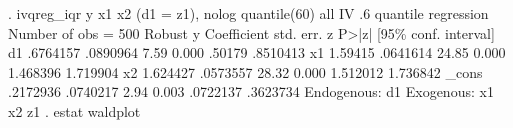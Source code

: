 . ivqreg_iqr y x1 x2 (d1 = z1), nolog quantile(60) all
{\smallskip}
IV .6 quantile regression             Number of obs               =        500
             {\VBAR}               Robust
           y {\VBAR} Coefficient  std. err.      z    P>|z|     [95\% conf. interval]
          d1 {\VBAR}   .6764157   .0890964     7.59   0.000       .50179    .8510413
          x1 {\VBAR}    1.59415   .0641614    24.85   0.000     1.468396    1.719904
          x2 {\VBAR}   1.624427   .0573557    28.32   0.000     1.512012    1.736842
       _cons {\VBAR}   .2172936   .0740217     2.94   0.003     .0722137    .3623734
Endogenous: d1
 Exogenous: x1 x2 z1
{\smallskip}
. estat waldplot
